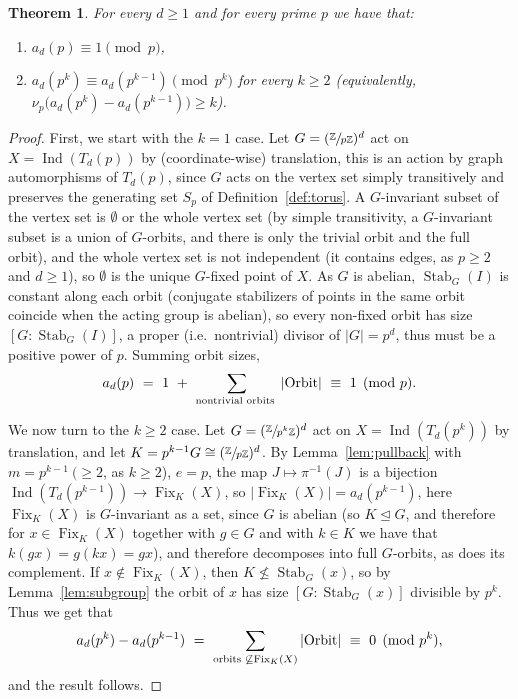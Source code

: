 \documentclass{article}
\theoremstyle{plain}
\newtheorem{theorem}{Theorem}[section]
\theoremstyle{definition}
\theoremstyle{remark}
\newcommand{\Z}{\mathbb{Z}}
\newcommand{\quot}[2]{\sfrac{#1}{#2}}
\DeclareMathOperator{\Fix}{Fix}
\DeclareMathOperator{\Stab}{Stab}
\DeclareMathOperator{\Ind}{Ind}
\begin{document}
\begin{theorem}\label{prop:Gauss}
For every $d\ge1$ and for every prime $p$ we have that:
\begin{enumerate}
\item $a_d(p)\equiv1\pmod p$,
\item $a_d(p^k)\equiv a_d(p^{k-1})\pmod{p^k}$ for every $k \geq 2$ (equivalently, $\nu_p\big(a_d(p^k)-a_d(p^{k-1})\big)\ge k$).
\end{enumerate}
\end{theorem}
\begin{proof}
First, we start with the $k=1$ case.  Let $G=(\quot{\Z}{p\Z})^d$ act on $X=\Ind(T_d(p))$ by (coordinate-wise) translation, this is an action by graph automorphisms of $T_d(p)$, since $G$ acts on the vertex set simply transitively and preserves the generating set $S_p$ of Definition~\ref{def:torus}. A $G$-invariant subset of the vertex set is $\emptyset$ or the whole vertex set (by simple transitivity, a $G$-invariant subset is a union of $G$-orbits, and there is only the trivial orbit and the full orbit), and the whole vertex set is not independent (it contains edges, as $p\ge2$ and $d\ge1$), so $\emptyset$ is the unique $G$-fixed point of $X$. As $G$ is abelian, $\Stab_G(I)$ is constant along each orbit (conjugate stabilizers of points in the same orbit coincide when the acting group is abelian), so every non-fixed orbit has size $[G:\Stab_G(I)]$, a proper (i.e.\ nontrivial) divisor of $|G|=p^d$, thus must be a positive power of $p$. Summing orbit sizes,
\[
a_d(p)\ =\ 1\ +\ \sum_{\text{nontrivial orbits }}|\textup{Orbit}|\ \equiv\ 1\pmod p.
\]

We now turn to the $k\ge2$ case. Let $G=(\quot{\Z}{p^k\Z})^d$ act on $X=\Ind(T_d(p^k))$ by translation, and let $K=p^{k-1}G\cong(\quot{\Z}{p\Z})^d$. By Lemma~\ref{lem:pullback} with $m=p^{k-1}\ (\ge2$, as $k\ge2$), $e=p$, the map $J\mapsto\pi^{-1}(J)$ is a bijection $\Ind(T_d(p^{k-1}))\to\Fix_K(X)$, so $|\Fix_K(X)|=a_d(p^{k-1})$, here $\Fix_K(X)$ is $G$-invariant as a set, since $G$ is abelian (so $K\trianglelefteq G$, and therefore  for $x\in\Fix_K(X)$ together with $g\in G$ and with $k\in K$ we have that $k(gx)=g(kx)=gx$), and therefore decomposes into full $G$-orbits, as does its complement. If $x\notin\Fix_K(X)$, then $K\not\le\Stab_G(x)$, so by Lemma~\ref{lem:subgroup} the orbit of $x$ has size $[G:\Stab_G(x)]$ divisible by $p^k$. Thus we get that
\[
a_d(p^k)-a_d(p^{k-1})\ =\ \sum_{\text{orbits }\not\subseteq\Fix_K(X)}|\textup{Orbit}|\ \equiv\ 0\pmod{p^k},
\]
and the result follows.  
\end{proof}
\end{document}
